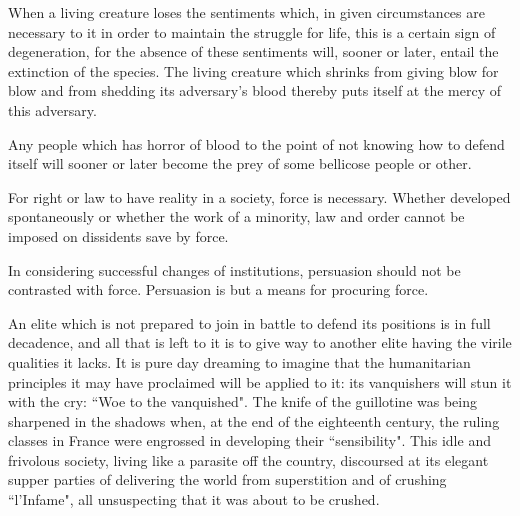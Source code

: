 \begin{quotex}
When a living creature loses the sentiments which, in given circumstances are necessary to it in order to maintain the struggle for life, this is a certain sign of degeneration, for the absence of these sentiments will, sooner or later, entail the extinction of the species. The living creature which shrinks from giving blow for blow and from shedding its adversary's blood thereby puts itself at the mercy of this adversary. 

Any people which has horror of blood to the point of not knowing how to defend itself will sooner or later become the prey of some bellicose people or other. 

For right or law to have reality in a society, force is necessary. Whether developed spontaneously or whether the work of a minority, law and order cannot be imposed on dissidents save by force. 

In considering successful changes of institutions, persuasion should not be contrasted with force. Persuasion is but a means for procuring force. 

An elite which is not prepared to join in battle to defend its positions is in full decadence, and all that is left to it is to give way to another elite having the virile qualities it lacks. It is pure day dreaming to imagine that the humanitarian principles it may have proclaimed will be applied to it: its vanquishers will stun it with the cry: ``Woe to the vanquished". The knife of the guillotine was being sharpened in the shadows when, at the end of the eighteenth century, the ruling classes in France were engrossed in developing their ``sensibility". This idle and frivolous society, living like a parasite off the country, discoursed at its elegant supper parties of delivering the world from superstition and of crushing ``l'Infame", all unsuspecting that it was about to be crushed. 

\end{quotex}


